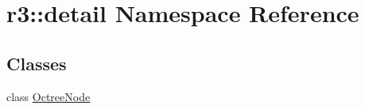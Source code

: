 \hypertarget{namespacer3_1_1detail}{}\section{r3\+:\+:detail Namespace Reference}
\label{namespacer3_1_1detail}
\subsection*{Classes}
\begin{DoxyCompactItemize}
\item 
class \mbox{\hyperlink{classr3_1_1detail_1_1_octree_node}{Octree\+Node}}
\end{DoxyCompactItemize}
